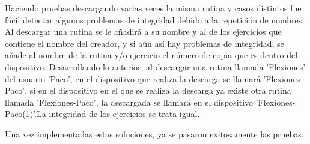 Haciendo pruebas descargando varias veces la misma rutina y casos distintos fue fácil detectar algunos problemas de integridad debido a la repetición de nombres. Al descargar una rutina se le añadirá a su nombre y al de los ejercicios que contiene el nombre del creador, y si aún así hay problemas de integridad, se añade al nombre de la rutina y/o ejercicio el número de copia que es dentro del dispositivo. Desarrollando lo anterior, al descargar una rutina llamada 'Flexiones' del usuario 'Paco', en el dispositivo que realiza la descarga se llamará 'Flexiones-Paco', si en el dispositivo en el que se realiza la descarga ya existe otra rutina llamada 'Flexiones-Paco', la descargada se llamará en el dispositivo 'Flexiones-Paco(1)'.La integridad de los ejercicios se trata igual.

Una vez implementadas estas soluciones, ya se pasaron exitosamente las pruebas.

